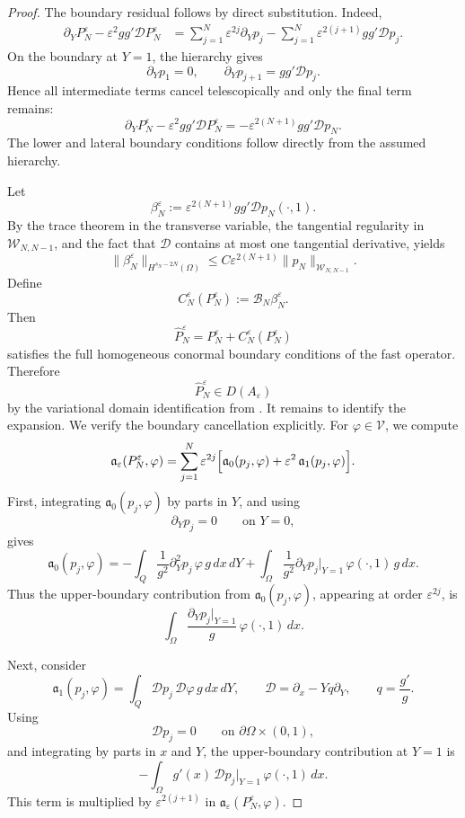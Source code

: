 \documentclass[11pt]{article}
\theoremstyle{definition}
\theoremstyle{remark}
\numberwithin{equation}{section}
\begin{document}
\begin{proof}
The boundary residual follows by direct substitution. Indeed,
\[
\begin{aligned}
\partial_YP_N^\varepsilon-\varepsilon^2 gg'\mathcal DP_N^\varepsilon
&=
\sum_{j=1}^N \varepsilon^{2j}\partial_Yp_j
-
\sum_{j=1}^N \varepsilon^{2(j+1)}gg'\mathcal Dp_j .
\end{aligned}
\]
On the boundary at \(Y=1\), the hierarchy gives
\[
\partial_Yp_1=0,
\qquad
\partial_Yp_{j+1}=gg'\mathcal Dp_j.
\]
Hence all intermediate terms cancel telescopically and only the final term
remains:
\[
\partial_YP_N^\varepsilon-\varepsilon^2 gg'\mathcal DP_N^\varepsilon
=
-\varepsilon^{2(N+1)}gg'\mathcal Dp_N.
\]
The lower and lateral boundary conditions follow directly from the assumed
hierarchy.

Let
\[
\beta_N^\varepsilon
:=
\varepsilon^{2(N+1)}gg'\mathcal Dp_N(\cdot,1).
\]
By the trace theorem in the transverse variable, the tangential regularity in
\(\mathcal W_{N,N-1}\), and the fact that \(\mathcal D\) contains at most one
tangential derivative, yields
\[
\|\beta_N^\varepsilon\|_{H^{s_N-2N}(\Omega)}
\le
C\varepsilon^{2(N+1)}\|p_N\|_{\mathcal W_{N,N-1}}.
\]
Define
\[
C_N^\varepsilon(P_N^\varepsilon)
:=
\mathscr B_N\beta_N^\varepsilon.
\]
Then
\[
\widehat P_N^\varepsilon
=
P_N^\varepsilon+C_N^\varepsilon(P_N^\varepsilon)
\]
satisfies the full homogeneous conormal boundary conditions of the fast
operator. Therefore
\[
\widehat P_N^\varepsilon\in D(A_\varepsilon)
\]
by the variational domain identification from
.
It remains to identify the expansion. We verify the boundary cancellation
explicitly. For \(\varphi\in\mathcal V\), we compute
\[
\mathfrak a_\varepsilon(P_N^\varepsilon,\varphi)
=
\sum_{j=1}^N
\varepsilon^{2j}
\Bigl[
\mathfrak a_0(p_j,\varphi)
+
\varepsilon^2\,\mathfrak a_1(p_j,\varphi)
\Bigr].
\]
First, integrating \(\mathfrak a_0(p_j,\varphi)\) by parts in \(Y\), and
using
\[
\partial_Yp_j=0
\qquad\text{on }Y=0,
\]
gives
\[
\mathfrak a_0(p_j,\varphi)
=
-
\int_Q
\frac1{g^2}\partial_Y^2p_j\,\varphi\,g\,dx\,dY
+
\int_\Omega
\frac1{g^2}\partial_Yp_j\big|_{Y=1}\,
\varphi(\cdot,1)\,g\,dx.
\]
Thus the upper-boundary contribution from
\(\mathfrak a_0(p_j,\varphi)\), appearing at order \(\varepsilon^{2j}\), is
\[
\int_\Omega
\frac{\partial_Yp_j|_{Y=1}}{g}\,
\varphi(\cdot,1)\,dx.
\]

Next, consider
\[
\mathfrak a_1(p_j,\varphi)
=
\int_Q
\mathcal Dp_j\,\mathcal D\varphi\,g\,dx\,dY,
\qquad
\mathcal D=\partial_x-Yq\partial_Y,
\qquad
q=\frac{g'}{g}.
\]
Using
\[
\mathcal Dp_j=0
\qquad\text{on }\partial\Omega\times(0,1),
\]
and integrating by parts in \(x\) and \(Y\), the upper-boundary contribution
at \(Y=1\) is
\[
-
\int_\Omega
g'(x)\,\mathcal Dp_j\big|_{Y=1}\,
\varphi(\cdot,1)\,dx.
\]
This term is multiplied by \(\varepsilon^{2(j+1)}\) in
\(\mathfrak a_\varepsilon(P_N^\varepsilon,\varphi)\).


\end{proof}
\end{document}
